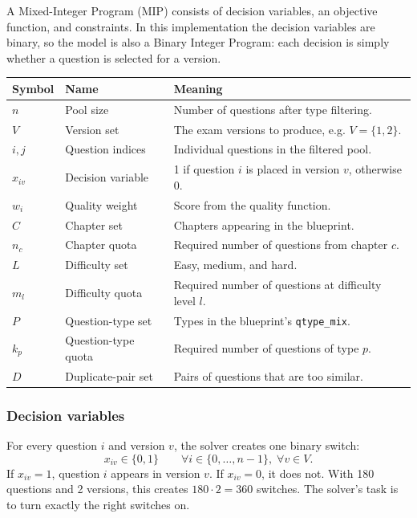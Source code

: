 \documentclass[11pt,a4paper]{article}
\newcommand{\code}[1]{\texttt{\small #1}}
\begin{document}
A Mixed-Integer Program (MIP) consists of decision variables, an objective
function, and constraints. In this implementation the decision variables are
binary, so the model is also a Binary Integer Program: each decision is simply
whether a question is selected for a version.

\begin{center}
\begin{tabular}{@{}lll@{}}
\toprule
\textbf{Symbol} & \textbf{Name} & \textbf{Meaning} \\
\midrule
$n$ & Pool size & Number of questions after type filtering. \\
$V$ & Version set & The exam versions to produce, e.g. $V=\{1,2\}$. \\
$i,j$ & Question indices & Individual questions in the filtered pool. \\
$x_{iv}$ & Decision variable & 1 if question $i$ is placed in version $v$, otherwise 0. \\
$w_i$ & Quality weight & Score from the quality function. \\
$C$ & Chapter set & Chapters appearing in the blueprint. \\
$n_c$ & Chapter quota & Required number of questions from chapter $c$. \\
$L$ & Difficulty set & Easy, medium, and hard. \\
$m_l$ & Difficulty quota & Required number of questions at difficulty level $l$. \\
$P$ & Question-type set & Types in the blueprint's \code{qtype\_mix}. \\
$k_p$ & Question-type quota & Required number of questions of type $p$. \\
$D$ & Duplicate-pair set & Pairs of questions that are too similar. \\
\bottomrule
\end{tabular}
\end{center}

\subsubsection{Decision variables}

For every question $i$ and version $v$, the solver creates one binary switch:
\begin{equation}
  x_{iv}\in\{0,1\}
  \qquad\forall i\in\{0,\ldots,n-1\},\;\forall v\in V.
\end{equation}
If $x_{iv}=1$, question $i$ appears in version $v$. If $x_{iv}=0$, it does not.
With 180 questions and 2 versions, this creates $180\cdot2=360$ switches. The
solver's task is to turn exactly the right switches on.
\end{document}
